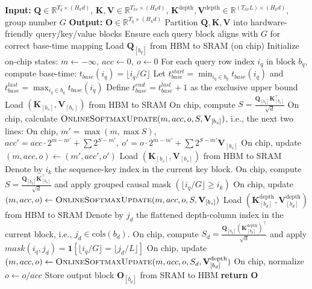 \documentclass[]{bytedance_seed}
\newcommand{\name}{MoDA}
\begin{document}
\begin{algorithm}[t]
\caption{\name{}: Hardware-aware Forward Pass}
\label{alg:moda_forward}
\begin{algorithmic}[1]
\STATE \textbf{Input:} $\mathbf{Q}\in\mathbb{R}^{T_q\times (H_kd)}$, $\mathbf{K},\mathbf{V}\in\mathbb{R}^{T_{kv}\times (H_kd)}$,  $\mathbf{K}^{\text{depth}},\mathbf{V}^{\text{depth}}\in\mathbb{R}^{(T_{kv}L)\times (H_kd)}$, group number $G$
\STATE \textbf{Output:} $\mathbf{O}\in\mathbb{R}^{T_q\times (H_kd)}$%
\STATE Partition $\mathbf{Q},\mathbf{K},\mathbf{V}$ into hardware-friendly query/key/value blocks
\STATE Ensure each query block aligns with $G$ for correct base-time mapping
    \STATE Load $\mathbf{Q}_{[b_q]}$ from HBM to SRAM (on chip)
    \STATE Initialize on-chip states: $m\leftarrow-\infty,\ acc\leftarrow 0,\ o\leftarrow 0$
    \STATE For each query row index $i_q$ in block $b_q$, compute base-time: $t_{base}(i_q)=\lfloor i_q/G\rfloor$
    \STATE Let $t_{base}^{start}=\min_{i_q\in b_q} t_{base}(i_q)$ and $t_{base}^{last}=\max_{i_q\in b_q} t_{base}(i_q)$
    \STATE Define $t_{base}^{end}=t_{base}^{last}+1$ as the exclusive upper bound
        \STATE Load $(\mathbf{K}_{[b_s]},\mathbf{V}_{[b_s]})$ from HBM to SRAM
        \STATE On chip, compute $S=\frac{\mathbf{Q}_{[b_q]}\mathbf{K}_{[b_s]}^\top}{\sqrt{d}}$%
        \STATE On chip, calculate $\textsc{OnlineSoftmaxUpdate}(m,acc,o,S,\mathbf{V}_{[b_s]})$, i.e., the next two lines:
        \STATE On chip, $m'=\max(m,\max S)$, $acc'=acc\cdot 2^{m-m'}+\textstyle\sum 2^{S-m'},\ 
        o'=o\cdot 2^{m-m'}+\textstyle\sum 2^{S-m'}\mathbf{V}_{[b_s]}$
        \STATE On chip, update $(m,acc,o)\leftarrow(m',acc',o')$ %
    \ENDFOR
        \STATE Load $(\mathbf{K}_{[b_s]},\mathbf{V}_{[b_s]})$ from HBM to SRAM
        \STATE Denote by $i_k$ the sequence-key index in the current key block.
        \STATE On chip, compute $S=\frac{\mathbf{Q}_{[b_q]}\mathbf{K}_{[b_s]}^\top}{\sqrt{d}}$ and apply grouped causal mask $(\lfloor i_q/G\rfloor\ge i_k)$
        \STATE On chip, update $(m,acc,o)\leftarrow\textsc{OnlineSoftmaxUpdate}(m,acc,o,S,\mathbf{V}_{[b_s]})$
    \ENDFOR
        \STATE Load $(\mathbf{K}^{\text{depth}}_{[b_d]},\mathbf{V}^{\text{depth}}_{[b_d]})$ from HBM to SRAM
        \STATE Denote by $j_d$ the flattened depth-column index in the current block, i.e., $j_d\in\mathrm{cols}(b_d)$.
        \STATE On chip, compute $S_d=\frac{\mathbf{Q}_{[b_q]}(\mathbf{K}^{\text{depth}}_{[b_d]})^\top}{\sqrt{d}}$ and apply $mask(i_q,j_d)=\mathbf{1}[\lfloor i_q/G\rfloor=\lfloor j_d/L\rfloor]$
        \STATE On chip, update $(m,acc,o)\leftarrow\textsc{OnlineSoftmaxUpdate}(m,acc,o,S_d,\mathbf{V}^{\text{depth}}_{[b_d]})$
    \ENDFOR
    \STATE On chip, normalize $o\leftarrow o/acc$
    \STATE Store output block $\mathbf{O}_{[b_q]}$ from SRAM to HBM
\ENDFOR
\STATE \textbf{return} $\mathbf{O}$%
\end{algorithmic}
\end{algorithm}
\end{document}
